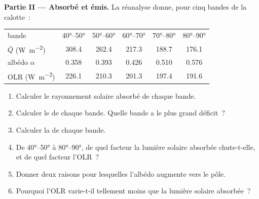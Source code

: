 \begin{problem}
\medskip
\noindent\textbf{Partie II --- Absorbé et émis.} La réanalyse donne, pour cinq
bandes de la calotte~:
\begin{center}
\small
\begin{tabular}{|l|ccccc|}
\hline
bande & \ang{40}--\ang{50} & \ang{50}--\ang{60} & \ang{60}--\ang{70} & \ang{70}--\ang{80} & \ang{80}--\ang{90} \\
$\bar Q$ (\unit{W.m^{-2}}) & 308.4 & 262.4 & 217.3 & 188.7 & 176.1 \\
albédo $\alpha$ & 0.358 & 0.393 & 0.426 & 0.510 & 0.576 \\
OLR (\unit{W.m^{-2}}) & 226.1 & 210.3 & 201.3 & 197.4 & 191.6 \\
\hline
\end{tabular}
\end{center}
\begin{enumerate}[resume]
  \item Calculer le rayonnement solaire absorbé de chaque bande.
  \item Calculer le  de chaque bande. Quelle bande a le plus grand
        déficit~?
  \item Calculer la  de chaque bande.
  \item De \ang{40}--\ang{50} à \ang{80}--\ang{90}, de quel facteur la lumière solaire
        absorbée chute-t-elle, et de quel facteur l'OLR~?
  \item Donner deux raisons pour lesquelles l'albédo augmente vers le pôle.
  \item Pourquoi l'OLR varie-t-il tellement moins que la lumière solaire absorbée~?
\end{enumerate}


\end{problem}
